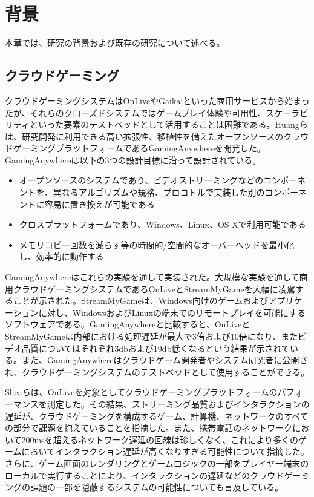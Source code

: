 \section{背景}
本章では、研究の背景および既存の研究について述べる。

\subsection{クラウドゲーミング}
クラウドゲーミングシステムはOnLiveやGaikaiといった商用サービスから始まったが、それらのクローズドシステムではゲームプレイ体験や可用性、スケーラビリティといった要素のテストベッドとして活用することは困難である。Huangら\cite{gaminganywhere}は、研究開発に利用できる高い拡張性、移植性を備えたオープンソースのクラウドゲーミングプラットフォームであるGamingAnywhereを開発した。GamingAnywhereは以下の3つの設計目標に沿って設計されている。
\begin{itemize}
    \item オープンソースのシステムであり、ビデオストリーミングなどのコンポーネントを、異なるアルゴリズムや規格、プロコトルで実装した別のコンポーネントに容易に置き換えが可能である
    \item クロスプラットフォームであり、Windows、Linux、OS Xで利用可能である
    \item メモリコピー回数を減らす等の時間的/空間的なオーバーヘッドを最小化し、効率的に動作する
\end{itemize}
GamingAnywhereはこれらの実験を通して実装された。大規模な実験を通して商用クラウドゲーミングシステムであるOnLiveとStreamMyGameを大幅に凌駕することが示された。StreamMyGameは、Windows向けのゲームおよびアプリケーションに対し、WindowsおよびLinuxの端末でのリモートプレイを可能にするソフトウェアである。GamingAnywhereと比較すると、OnLiveとStreamMyGameは内部における処理遅延が最大で3倍および10倍になり、またビデオ品質についてはそれぞれ3dbおよび19db低くなるという結果が示されている。また、GamingAnywhereはクラウドゲーム開発者やシステム研究者に公開され、クラウドゲーミングシステムのテストベッドとして使用することができる。

Sheaら\cite{cloudperformance}は、OnLiveを対象としてクラウドゲーミングプラットフォームのパフォーマンスを測定した。その結果、ストリーミング品質およびインタラクションの遅延が、クラウドゲーミングを構成するゲーム、計算機、ネットワークのすべての部分で課題を抱えていることを指摘した。また、携帯電話のネットワークにおいて200msを超えるネットワーク遅延の回線は珍しくなく、これにより多くのゲームにおいてインタラクション遅延が高くなりすぎる可能性について指摘した。さらに、ゲーム画面のレンダリングとゲームロジックの一部をプレイヤー端末のローカルで実行することにより、インタラクションの遅延などのクラウドゲーミングの課題の一部を隠蔽するシステムの可能性についても言及している。

